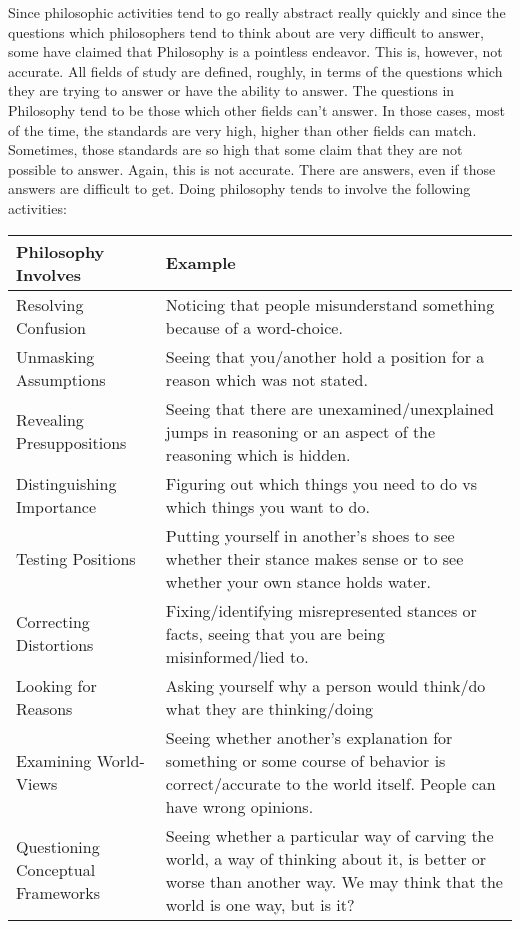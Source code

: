 Since philosophic activities tend to go really abstract really quickly and since the questions which philosophers tend to think about are very difficult to answer, some have claimed that Philosophy is a pointless endeavor. This is, however, not accurate. All fields of study are defined, roughly, in terms of the questions which they are trying to answer or have the ability to answer. The questions in Philosophy tend to be those which other fields can't answer. In those cases, most of the time, the standards are very high, higher than other fields can match. Sometimes, those standards are so high that some claim that they are not possible to answer. Again, this is not accurate. There are answers, even if those answers are difficult to get. Doing philosophy tends to involve the following activities:
\begin{tabular}{p{2in}|p{3.5in}}\hline
Philosophy Involves&Example\\\hline
Resolving Confusion &Noticing that people misunderstand something because of a word-choice.\\\hline
Unmasking Assumptions &Seeing that you/another hold a position for a reason which was not stated.\\\hline
Revealing Presuppositions &Seeing that there are unexamined/unexplained jumps in reasoning or an aspect of the reasoning which is hidden.\\\hline
Distinguishing Importance &Figuring out which things you need to do vs which things you want to do.\\\hline
Testing Positions &Putting yourself in another's shoes to see whether their stance makes sense or to see whether your own stance holds water.\\\hline
Correcting Distortions &Fixing/identifying misrepresented stances or facts, seeing that you are being misinformed/lied to.\\\hline
Looking for Reasons &Asking yourself why a person would think/do what they are thinking/doing\\\hline
Examining World-Views &Seeing whether another's explanation for something or some course of behavior is correct/accurate to the world itself. People can have wrong opinions.\\ \hline
Questioning Conceptual Frameworks &Seeing whether a particular way of carving the world, a way of thinking about it, is better or worse than another way. We may think that the world is one way, but is it?
\end{tabular}

